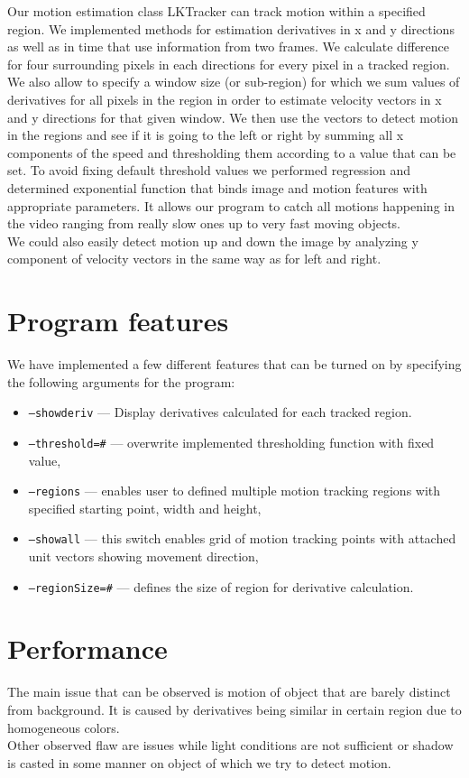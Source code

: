 \documentclass[12pt,a4paper,twocolumn]{article}
\begin{document}
Our motion estimation class LKTracker can track motion within a specified region. We implemented methods for estimation derivatives in x and y directions as well as in time that use information from two frames. We calculate difference for four 
surrounding pixels in each directions for every pixel in a tracked region. We also allow to specify a window size (or sub-region) for which we sum values of derivatives for all pixels
in the region in order to estimate velocity vectors in x and y directions for that given window. We then use the vectors to detect motion in the regions and see if it is going to the left or right by summing all x components of the speed and thresholding them according to a value that can be set.
To avoid fixing default threshold values we performed regression and determined exponential function that binds image and motion features with appropriate parameters. It allows our program to catch all motions happening in the video ranging from really slow ones up to very fast moving objects.\\
We could also easily detect motion up and down the image by analyzing y component of velocity vectors in the same way as for left and right.

\section*{Program features}
We have implemented a few different features that can be turned on by specifying the following arguments for the program:
\begin{itemize}
\item \texttt{--showderiv} --- Display derivatives calculated for each tracked region.
\item \texttt{--threshold=\textit{\#}} --- overwrite implemented thresholding function with fixed value,
\item \texttt{--regions} --- enables user to defined multiple motion tracking regions with specified starting point, width and height,
\item \texttt{--showall} --- this switch enables grid of motion tracking points with attached unit vectors showing movement direction,
\item \texttt{--regionSize=\textit{\#}} --- defines the size of region for derivative calculation.
\end{itemize}

\section*{Performance}
The main issue that can be observed is motion of object that are barely distinct from background. It is caused by derivatives being similar in certain region due to homogeneous colors.\\
Other observed flaw are issues while light conditions are not sufficient or shadow is casted in some manner on object of which we try to detect motion.\\
\end{document}
